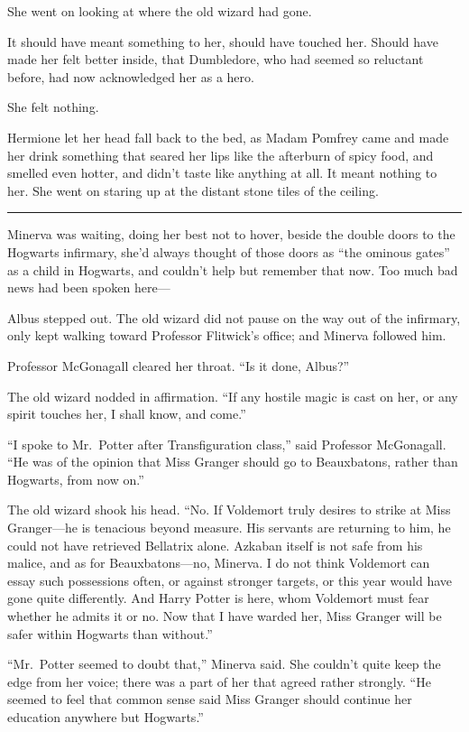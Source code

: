 She went on looking at where the old wizard had gone.

It should have meant something to her, should have touched her. Should
have made her felt better inside, that Dumbledore, who had seemed so
reluctant before, had now acknowledged her as a hero.

She felt nothing.

Hermione let her head fall back to the bed, as Madam Pomfrey came and
made her drink something that seared her lips like the afterburn of
spicy food, and smelled even hotter, and didn't taste like anything at
all. It meant nothing to her. She went on staring up at the distant
stone tiles of the ceiling.

\begin{center}\rule{3in}{0.4pt}\end{center}

Minerva was waiting, doing her best not to hover, beside the double
doors to the Hogwarts infirmary, she'd always thought of those doors as
``the ominous gates'' as a child in Hogwarts, and couldn't help but
remember that now. Too much bad news had been spoken here---

Albus stepped out. The old wizard did not pause on the way out of the
infirmary, only kept walking toward Professor Flitwick's office; and
Minerva followed him.

Professor McGonagall cleared her throat. ``Is it done, Albus?''

The old wizard nodded in affirmation. ``If any hostile magic is cast on
her, or any spirit touches her, I shall know, and come.''

``I spoke to Mr.~Potter after Transfiguration class,'' said Professor
McGonagall. ``He was of the opinion that Miss Granger should go to
Beauxbatons, rather than Hogwarts, from now on.''

The old wizard shook his head. ``No. If Voldemort truly desires to
strike at Miss Granger---he is tenacious beyond measure. His servants
are returning to him, he could not have retrieved Bellatrix alone.
Azkaban itself is not safe from his malice, and as for Beauxbatons---no,
Minerva. I do not think Voldemort can essay such possessions often, or
against stronger targets, or this year would have gone quite
differently. And Harry Potter is here, whom Voldemort must fear whether
he admits it or no. Now that I have warded her, Miss Granger will be
safer within Hogwarts than without.''

``Mr.~Potter seemed to doubt that,'' Minerva said. She couldn't quite
keep the edge from her voice; there was a part of her that agreed rather
strongly. ``He seemed to feel that common sense said Miss Granger should
continue her education anywhere but Hogwarts.''

